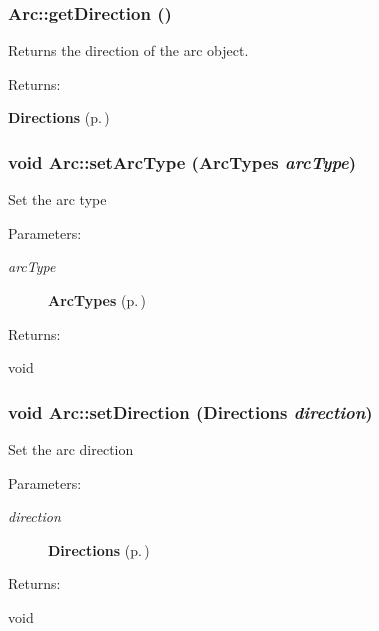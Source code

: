 \subsubsection{ Arc::get\-Direction ()\hspace{0.3cm}{\tt  [inline]}}\label{classArc_a5}


Returns the direction of the arc object. \begin{Desc}
\item[Returns: ]\par
{\bf Directions} {\rm (p.\,\pageref{classArc_s4})} \end{Desc}
\subsubsection{\setlength{\rightskip}{0pt plus 5cm}void Arc::set\-Arc\-Type ({\bf Arc\-Types} {\em arc\-Type})\hspace{0.3cm}{\tt  [inline]}}\label{classArc_a3}


Set the arc type \begin{Desc}
\item[Parameters: ]\par
\begin{description}
\item[{\em 
arc\-Type}]{\bf Arc\-Types} {\rm (p.\,\pageref{classArc_s5})} \end{description}
\end{Desc}
\begin{Desc}
\item[Returns: ]\par
void \end{Desc}
\subsubsection{\setlength{\rightskip}{0pt plus 5cm}void Arc::set\-Direction ({\bf Directions} {\em direction})\hspace{0.3cm}{\tt  [inline, protected]}}\label{classArc_b0}


Set the arc direction \begin{Desc}
\item[Parameters: ]\par
\begin{description}
\item[{\em 
direction}]{\bf Directions} {\rm (p.\,\pageref{classArc_s4})} \end{description}
\end{Desc}
\begin{Desc}
\item[Returns: ]\par
void \end{Desc}
